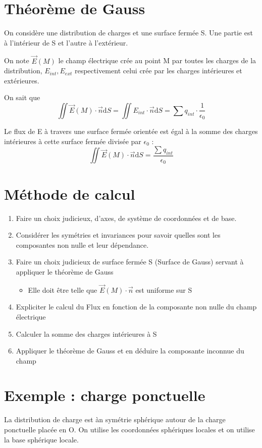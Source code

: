 \documentclass[french]{yLectureNote}
\renewcommand{\vec}{\overrightarrow}
\newcommand{\dd}{\mathrm{d}}
\newcommand{\E}{\vec{E}(M)}
\begin{document}
\section{Théorème de Gauss}
On considère une distribution de charges et une surface fermée S. Une partie est à l'intérieur de S et l'autre à l'extérieur.

On note \(\E\) le champ électrique crée au point M par toutes les charges de la distribution, \(E_{int}, E_{ext}\) respectivement celui crée par les charges intérieures et extérieures.

On sait que \[\iint \E\cdot \vec{n}\dd S = \iint E_{int}\cdot \vec{n}\dd S = \sum q_{int} \cdot \frac{1}{\epsilon_0}\]
\begin{theorem}
Le flux de E à travers une surface fermée orientée est égal à la somme des charges intérieures à cette surface fermée divisée par \(\epsilon_0\) :
\[\iint \E\cdot \vec{n}\dd S = \frac{\sum q_{int}}{\epsilon_0}\]
\end{theorem}
\section{Méthode de calcul}
\begin{enumerate}
 \item Faire un choix judicieux, d'axes, de système de coordonnées et de base.
 \item Considérer les symétries et invariances pour savoir quelles sont les composantes non nulle et leur dépendance.
 \item Faire un choix judicieux de surface fermée S (Surface de Gauss) servant à appliquer le théorème de Gauss
 \begin{itemize}
  \item Elle doit \^etre telle que \(\E\cdot \vec{n}\) est uniforme sur S
 \end{itemize}
\item Expliciter le calcul du Flux en fonction de la composante non nulle du champ électrique
\item Calculer la somme des charges intérieures à S
\item Appliquer le théorème de Gauss et en déduire la composante inconnue du champ
\end{enumerate}
\section{Exemple : charge ponctuelle}
La distribution de charge est àn symétrie sphérique autour de la charge ponctuelle placée en O. On utilise les coordonnées sphériques locales et on utilise la base sphérique locale.
\end{document}
